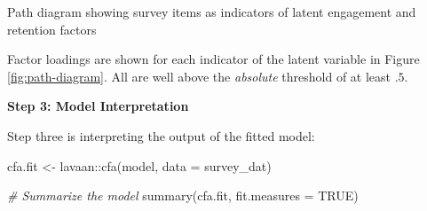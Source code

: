 \documentclass[
]{book}
\newenvironment{Shaded}{\begin{snugshade}}{\end{snugshade}}
\newcommand{\AttributeTok}[1]{\textcolor[rgb]{0.77,0.63,0.00}{#1}}
\newcommand{\CommentTok}[1]{\textcolor[rgb]{0.56,0.35,0.01}{\textit{#1}}}
\newcommand{\ConstantTok}[1]{\textcolor[rgb]{0.00,0.00,0.00}{#1}}
\newcommand{\FunctionTok}[1]{\textcolor[rgb]{0.00,0.00,0.00}{#1}}
\newcommand{\NormalTok}[1]{#1}
\newcommand{\OtherTok}[1]{\textcolor[rgb]{0.56,0.35,0.01}{#1}}
\newcommand{\SpecialCharTok}[1]{\textcolor[rgb]{0.00,0.00,0.00}{#1}}
\begin{document}
\label{fig:path-diagram}Path diagram showing survey items as indicators of latent engagement and retention factors

Factor loadings are shown for each indicator of the latent variable in Figure \ref{fig:path-diagram}. All are well above the \emph{absolute} threshold of at least \(.5\).

\textbf{Step 3: Model Interpretation}

Step three is interpreting the output of the fitted model:

\begin{Shaded}
\begin{Highlighting}[]
\NormalTok{cfa.fit }\OtherTok{\textless{}{-}}\NormalTok{ lavaan}\SpecialCharTok{::}\FunctionTok{cfa}\NormalTok{(model, }\AttributeTok{data =}\NormalTok{ survey\_dat)}

\CommentTok{\# Summarize the model}
\FunctionTok{summary}\NormalTok{(cfa.fit, }\AttributeTok{fit.measures =} \ConstantTok{TRUE}\NormalTok{)}
\end{Highlighting}
\end{Shaded}
\end{document}
